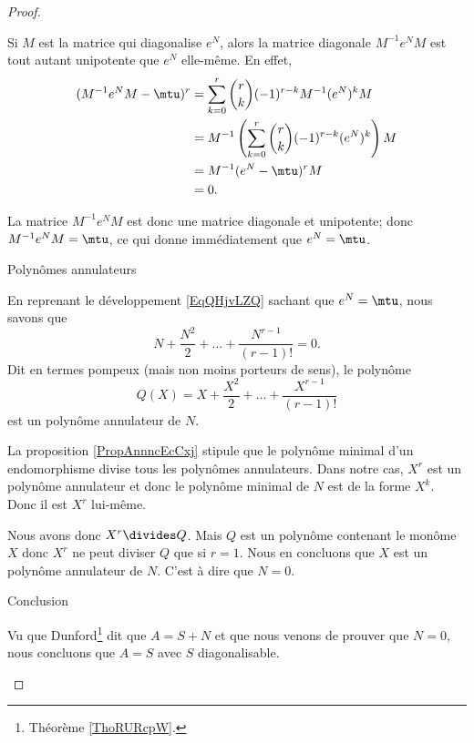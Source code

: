 \begin{proof}
\begin{subproof}
            Si \( M\) est la matrice qui diagonalise \( e^N\), alors la matrice diagonale \( M^{-1}e^NM\) est tout autant unipotente que \( e^N\) elle-même. En effet,
            \begin{subequations}
                \begin{align}
                    (M^{-1}e^NM-\mtu)^r&=\sum_{k=0}^r\binom{ r }{ k }(-1)^{r-k}M^{-1}(e^N)^kM\\
                    &=M^{-1}\left( \sum_{k=0}^r\binom{ r }{ k }(-1)^{r-k}(e^N)^k \right)M\\
                    &=M^{-1}(e^N-\mtu)^rM\\
                    &=0.
                \end{align}
            \end{subequations}

            La matrice \( M^{-1}e^NM\) est donc une matrice diagonale et unipotente; donc \( M^{-1}e^NM=\mtu\), ce qui donne immédiatement que \( e^N=\mtu\).

        \item[Polynômes annulateurs]

            En reprenant le développement \eqref{EqQHjvLZQ} sachant que \( e^N=\mtu\), nous savons que
            \begin{equation}
                N+\frac{ N^2 }{2}+\ldots +\frac{ N^{r-1} }{ (r-1)! }=0.
            \end{equation}
            Dit en termes pompeux (mais non moins porteurs de sens), le polynôme
            \begin{equation}
                Q(X)=X+\frac{ X^2 }{2}+\ldots +\frac{ X^{r-1} }{ (r-1)! }
            \end{equation}
            est un polynôme annulateur de \( N\).
            
            La proposition \ref{PropAnnncEcCxj} stipule que le polynôme minimal d'un endomorphisme divise tous les polynômes annulateurs. Dans notre cas, \( X^r\) est un polynôme annulateur et donc le polynôme minimal de \( N\) est de la forme \( X^k\). Donc il est \( X^r\) lui-même.
            
            Nous avons donc \( X^r\divides Q\). Mais \( Q\) est un polynôme contenant le monôme \( X\) donc \( X^r\) ne peut diviser \( Q\) que si \( r=1\). Nous en concluons que \( X\) est un polynôme annulateur de \( N\). C'est à dire que \( N=0\).

        \item[Conclusion]

            Vu que Dunford\footnote{Théorème \ref{ThoRURcpW}.} dit que \( A=S+N\) et que nous venons de prouver que \( N=0\), nous concluons que \( A=S\) avec \( S\) diagonalisable.

    \end{subproof}
\end{proof}

